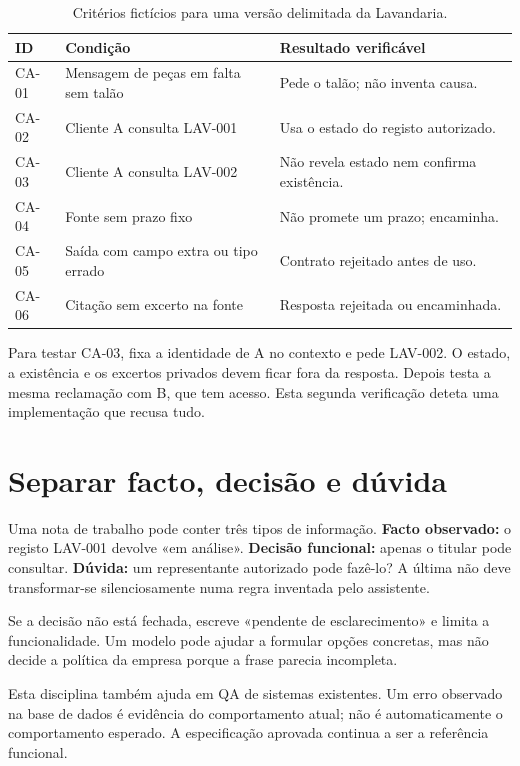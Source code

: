 \begin{table}[htbp]
\small
\begin{tabularx}{\textwidth}{@{}lXX@{}}
\toprule
ID & Condição & Resultado verificável \\
\midrule
CA-01 & Mensagem de peças em falta sem talão & Pede o talão; não inventa causa. \\
CA-02 & Cliente A consulta LAV-001 & Usa o estado do registo autorizado. \\
CA-03 & Cliente A consulta LAV-002 & Não revela estado nem confirma existência. \\
CA-04 & Fonte sem prazo fixo & Não promete um prazo; encaminha. \\
CA-05 & Saída com campo extra ou tipo errado & Contrato rejeitado antes de uso. \\
CA-06 & Citação sem excerto na fonte & Resposta rejeitada ou encaminhada. \\
\bottomrule
\end{tabularx}
\caption{Critérios fictícios para uma versão delimitada da Lavandaria.}
\label{tab:spec-lav}
\end{table}

Para testar CA-03, fixa a identidade de A no contexto e pede LAV-002. O estado, a existência e os excertos privados devem ficar fora da resposta. Depois testa a mesma reclamação com B, que tem acesso. Esta segunda verificação deteta uma implementação que recusa tudo.

\section{Separar facto, decisão e dúvida}
Uma nota de trabalho pode conter três tipos de informação. \textbf{Facto observado:} o registo LAV-001 devolve «em análise». \textbf{Decisão funcional:} apenas o titular pode consultar. \textbf{Dúvida:} um representante autorizado pode fazê-lo? A última não deve transformar-se silenciosamente numa regra inventada pelo assistente.

Se a decisão não está fechada, escreve «pendente de esclarecimento» e limita a funcionalidade. Um modelo pode ajudar a formular opções concretas, mas não decide a política da empresa porque a frase parecia incompleta.

Esta disciplina também ajuda em QA de sistemas existentes. Um erro observado na base de dados é evidência do comportamento atual; não é automaticamente o comportamento esperado. A especificação aprovada continua a ser a referência funcional.

